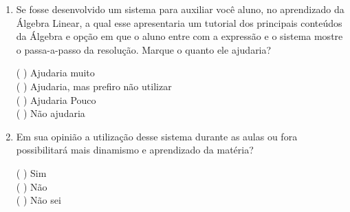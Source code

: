 \begin{enumerate}
\_\_\_\_\_\_\_\_\_\_\_\_\_\_\_\_\_\_\_\_\_\_\_\_\_\_\_\_\_\_\_\_\_\_\_\_\_\_\_\_\_\_\_\_\_\_\_\_\_\_\_\_\_\_\_\_\_\_\_\_\_\_\_\_\_\_\_\_\_\_\_\_\_\_\_\_\_\_\_\_\_\_\_\_\_\_\_\_\_\_\_\_\_\_\_\_\_\_\_\_\_\_\_\_\_\_\_\_\_\_\_\_\_\_\_\_\_\_\_\_\_\_\_\_\_\_\_\_\_\_\_\_\_\_\_\_\_\_\_\_\_\_\_\_\_\_\_\_\_\_\_\_\_\_\_\_\_\_\_\_\_\_\_\_\_\_\_\_\_\_\_\_\_\_\_\_

\item Se fosse desenvolvido um sistema para auxiliar você aluno, no aprendizado da Álgebra Linear, a qual esse apresentaria um tutorial dos principais conteúdos da Álgebra e opção em que o aluno entre com a expressão e o sistema mostre o passa-a-passo da resolução. Marque o quanto ele ajudaria?

(   ) Ajudaria muito\\
(   ) Ajudaria, mas prefiro não utilizar\\
(   ) Ajudaria Pouco\\
(   ) Não ajudaria 

\item Em sua opinião a utilização desse sistema durante as aulas ou fora possibilitará mais dinamismo e aprendizado da matéria?

(   ) Sim\\
(   ) Não\\
(   ) Não sei

\end{enumerate}
